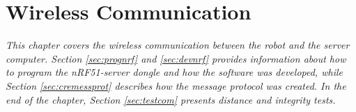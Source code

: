 \chapter{Wireless Communication}
\textit{This chapter covers the wireless communication between the robot and the server computer. Section \ref{sec:prognrf} and \ref{sec:devnrf} provides information about how to program the nRF51-server dongle and how the software was developed, while Section \ref{sec:cremessprot} describes how the message protocol was created. In the end of the chapter, Section \ref{sec:testcom} presents distance and integrity tests.}


